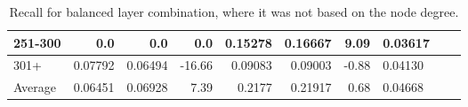 \begin{table}[]
\begin{tabular}{|l|r|r|r||r|r|r||l|l|l|}
        251-300   & 0.0                                     & 0.0                           & 0.0                              & 0.15278                    & 0.16667                  & 9.09                       & 0.03617 &     &      \\ \hline
        301+      & 0.07792                                 & 0.06494                       & -16.66                           & 0.09083                    & 0.09003                  & -0.88                      & 0.04130 &     &      \\ \hline
        Average   & 0.06451                                 & 0.06928                       & 7.39                             & 0.2177                     & 0.21917                  & 0.68                       & 0.04668 &     &      \\ \hline
    \end{tabular}
    \caption{Recall for balanced layer combination, where it was not based on the node degree.}
    \label{tab:balanced-layer-combination-recall}
\end{table}